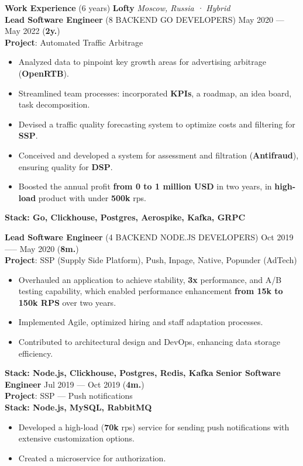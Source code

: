 \documentclass{resume}
\begin{document}
\begin{rSection}{\textbf{Work Experience} (6 years) }
\textbf{Lofty} \hfill \textit{Moscow, Russia · Hybrid} \\
\textbf{Lead Software Engineer} (8 BACKEND GO DEVELOPERS) \hfill May 2020 --- May 2022 ({\textbf{2y.}}) \\
\textbf{Project}: Automated Traffic Arbitrage
\begin{itemize}
    \item Analyzed data to pinpoint key growth areas for advertising arbitrage (\textbf{OpenRTB})\@.
    \item Streamlined team processes: incorporated \textbf{KPIs}, a roadmap, an idea board, task decomposition\@.
    \item Devised a traffic quality forecasting system to optimize costs and filtering for \textbf{SSP}\@.
    \item Conceived and developed a system for assessment and filtration (\textbf{Antifraud}), ensuring quality for \textbf{DSP}\@.
    \item Boosted the annual profit \textbf{from 0 to 1 million USD} in two years, in \textbf{high-load} product with under \textbf{500k} rps\@.
\end{itemize}
\textbf{Stack: Go, Clickhouse, Postgres, Aerospike, Kafka, GRPC}


\textbf{Lead Software Engineer} (4 BACKEND NODE.JS DEVELOPERS) \hfill Oct 2019 —-- May 2020 ({\textbf{8m.}}) \\
\textbf{Project}: SSP (Supply Side Platform), Push, Inpage, Native, Popunder (AdTech)
\begin{itemize}
    \item Overhauled an application to achieve stability, \textbf{3x} performance, and A/B testing capability,
    which enabled performance enhancement \textbf{from 15k to 150k RPS} over two years\@.
    \item Implemented Agile, optimized hiring and staff adaptation processes\@.
    \item Contributed to architectural design and DevOps, enhancing data storage efficiency\@.
\end{itemize}
\textbf{Stack: Node.js, Clickhouse, Postgres, Redis, Kafka}
\clearpage
\textbf{Senior Software Engineer} \hfill Jul 2019 --- Oct 2019 ({\textbf{4m.}}) \\
\textbf{Project}: SSP --- Push notifications \\
\textbf{Stack: Node.js, MySQL, RabbitMQ}
\begin{itemize}
    \item Developed a high-load (\textbf{70k} rps) service for sending push notifications with extensive customization options\@.
    \item Created a microservice for authorization\@.
\end{itemize}


\end{rSection}
\end{document}
